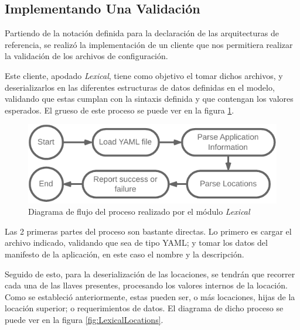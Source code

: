 \subsection{Implementando Una Validación} \label{sec:validation}


Partiendo de la notación definida para la declaración de las arquitecturas de referencia, se realizó la implementación de un cliente que nos permitiera realizar la validación de los archivos de configuración.

Este cliente, apodado \textit{Lexical}, tiene como objetivo el tomar dichos archivos, y deserializarlos en las diferentes estructuras de datos definidas en el modelo, validando que estas cumplan con la sintaxis definida y que contengan los valores esperados. El grueso de este proceso se puede ver en la figura \ref*{fig:LexicalFlow}.

\begin{figure}[ht]
    \centering
    \caption{Diagrama de flujo del proceso realizado por el módulo \textit{Lexical}}
    \label{fig:LexicalFlow}
    \vspace{2mm}
    \includegraphics[width=0.75\linewidth]{images/LexicalFlow.pdf}
\end{figure}

Las 2 primeras partes del proceso son bastante directas. Lo primero es cargar el archivo indicado, validando que sea de tipo YAML; y tomar los datos del manifesto de la aplicación, en este caso el nombre y la descripción.

Seguido de esto, para la deserialización de las locaciones, se tendrán que recorrer cada una de las llaves presentes, procesando los valores internos de la locación. Como se estableció anteriormente, estas pueden ser, o más locaciones, hijas de la locación superior; o requerimientos de datos. El diagrama de dicho proceso se puede ver en la figura \ref{fig:LexicalLocations}.

